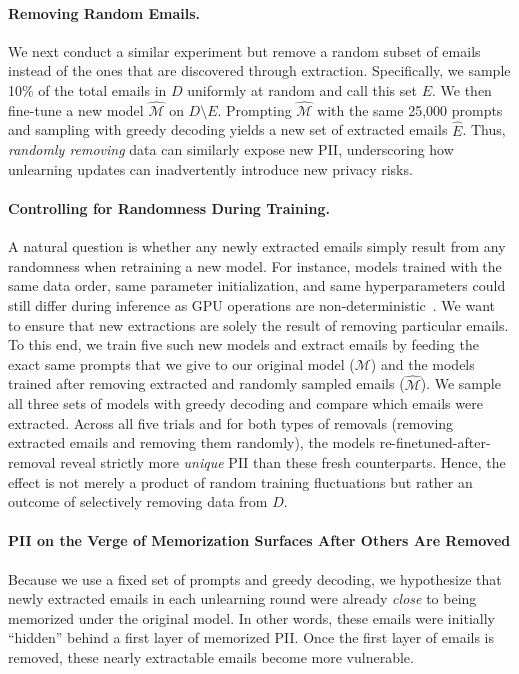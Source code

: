 \paragraph{Removing Random Emails.}
We next conduct a similar experiment but remove a random subset of emails instead of the ones that are discovered through extraction. Specifically, we sample 10\% of the total emails in \(D\) uniformly at random and call this set \(E\). We then fine-tune a new model \(\hat{\mathcal{M}}\) on \(D \setminus E\). Prompting \(\hat{\mathcal{M}}\) with the same 25,000 prompts and sampling with greedy decoding yields a new set of extracted emails \(\hat{E}\). 
Thus, \emph{randomly removing} data can similarly expose new PII, underscoring how unlearning updates can inadvertently introduce new privacy risks.


\paragraph{Controlling for Randomness During Training.} 
A natural question is whether any newly extracted emails simply result from any randomness when retraining a new model. 
For instance, models trained with the same data order, same parameter initialization, and same hyperparameters could
still differ during inference as GPU operations are non-deterministic~\citep{highfidelityextraction}. We want to ensure that new extractions are solely the result of removing particular emails. To this end, we train five such new models and extract emails by feeding the exact same prompts that we give to our original model (\(\mathcal{M}\)) and the models trained after removing extracted and randomly sampled emails (\(\hat{\mathcal{M}}\)). 
We sample all three sets of models with greedy decoding and compare which emails were extracted. %
Across all five trials and for both types of removals (removing extracted emails and removing them randomly), the models re-finetuned-after-removal reveal strictly more \emph{unique} PII than these fresh counterparts. Hence, the effect is not merely a product of random training fluctuations but rather an outcome of selectively removing data from \(D\).





\paragraph{PII on the Verge of Memorization Surfaces After Others Are Removed}
\label{subsec:almost_extracted_pii}
Because we use a fixed set of prompts and greedy decoding, we hypothesize that newly extracted emails in each unlearning round were already \emph{close} to being memorized under the original model. In other words, these emails were initially ``hidden'' behind a first layer of memorized PII. Once the first layer of emails is removed, these nearly extractable emails become more vulnerable. %

